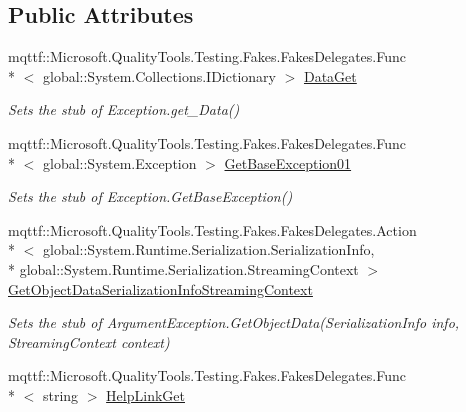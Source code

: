 \subsection*{Public Attributes}
\begin{DoxyCompactItemize}
\item 
mqttf\-::\-Microsoft.\-Quality\-Tools.\-Testing.\-Fakes.\-Fakes\-Delegates.\-Func\\*
$<$ global\-::\-System.\-Collections.\-I\-Dictionary $>$ \hyperlink{class_system_1_1_component_model_1_1_fakes_1_1_stub_invalid_enum_argument_exception_a606ea6828dd4bc8ddbba5a4a00fb1ecd}{Data\-Get}
\begin{DoxyCompactList}\small\item\em Sets the stub of Exception.\-get\-\_\-\-Data()\end{DoxyCompactList}\item 
mqttf\-::\-Microsoft.\-Quality\-Tools.\-Testing.\-Fakes.\-Fakes\-Delegates.\-Func\\*
$<$ global\-::\-System.\-Exception $>$ \hyperlink{class_system_1_1_component_model_1_1_fakes_1_1_stub_invalid_enum_argument_exception_aa74a7d58a143f1f8f9816398d6ee21ca}{Get\-Base\-Exception01}
\begin{DoxyCompactList}\small\item\em Sets the stub of Exception.\-Get\-Base\-Exception()\end{DoxyCompactList}\item 
mqttf\-::\-Microsoft.\-Quality\-Tools.\-Testing.\-Fakes.\-Fakes\-Delegates.\-Action\\*
$<$ global\-::\-System.\-Runtime.\-Serialization.\-Serialization\-Info, \\*
global\-::\-System.\-Runtime.\-Serialization.\-Streaming\-Context $>$ \hyperlink{class_system_1_1_component_model_1_1_fakes_1_1_stub_invalid_enum_argument_exception_ab76e35651786e84937ea74446584f129}{Get\-Object\-Data\-Serialization\-Info\-Streaming\-Context}
\begin{DoxyCompactList}\small\item\em Sets the stub of Argument\-Exception.\-Get\-Object\-Data(\-Serialization\-Info info, Streaming\-Context context)\end{DoxyCompactList}\item 
mqttf\-::\-Microsoft.\-Quality\-Tools.\-Testing.\-Fakes.\-Fakes\-Delegates.\-Func\\*
$<$ string $>$ \hyperlink{class_system_1_1_component_model_1_1_fakes_1_1_stub_invalid_enum_argument_exception_aefa01214411c544149292091d807b9e2}{Help\-Link\-Get}

\end{DoxyCompactItemize}
